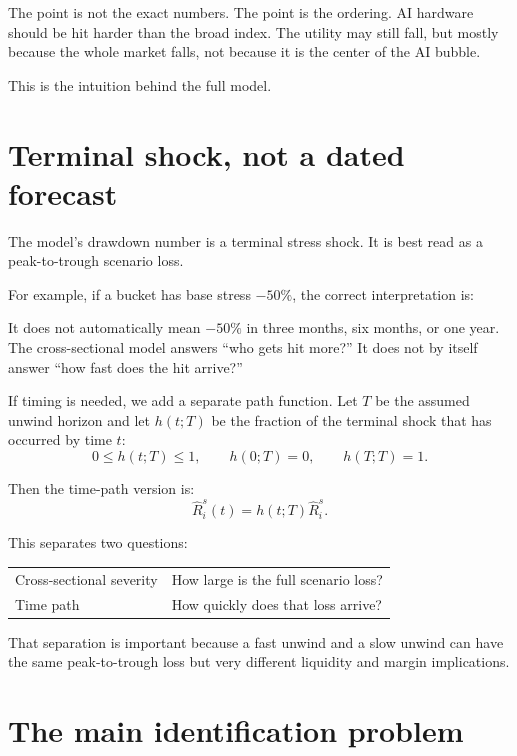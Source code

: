 \documentclass[10pt]{article}
\begin{document}
The point is not the exact numbers. The point is the ordering. AI hardware should be hit harder than the broad index. The utility may still fall, but mostly because the whole market falls, not because it is the center of the AI bubble.

This is the intuition behind the full model.

\section{Terminal shock, not a dated forecast}

The model's drawdown number is a terminal stress shock. It is best read as a peak-to-trough scenario loss.

For example, if a bucket has base stress $-50\%$, the correct interpretation is:

\begin{center}
\end{center}

It does not automatically mean $-50\%$ in three months, six months, or one year. The cross-sectional model answers ``who gets hit more?'' It does not by itself answer ``how fast does the hit arrive?''

If timing is needed, we add a separate path function. Let $T$ be the assumed unwind horizon and let $h(t;T)$ be the fraction of the terminal shock that has occurred by time $t$:
\[
0\leq h(t;T)\leq 1, \qquad h(0;T)=0, \qquad h(T;T)=1.
\]

Then the time-path version is:
\[
\widehat R_i^s(t)=h(t;T)\widehat R_i^s.
\]

This separates two questions:

\begin{center}
\begin{tabular}{ll}
Cross-sectional severity & How large is the full scenario loss? \\
Time path & How quickly does that loss arrive?
\end{tabular}
\end{center}

That separation is important because a fast unwind and a slow unwind can have the same peak-to-trough loss but very different liquidity and margin implications.

\section{The main identification problem}
\end{document}
